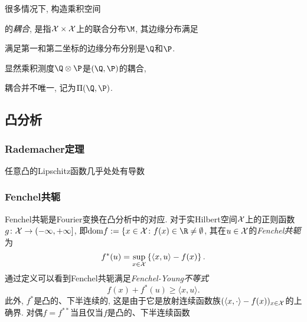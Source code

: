很多情况下, 构造乘积空间

的\emph{耦合}, 是指$\mathcal{X} \times \mathcal{X}$上的联合分布$\M$, 其边缘分布满足

满足第一和第二坐标的边缘分布分别是$\Q$和$\P$.


显然乘积测度$\Q \otimes \P$是$(\Q, \P)$的耦合, 

耦合并不唯一, 记为$\Pi(\Q, \P)$. 


\subsection{凸分析}

\subsubsection{Rademacher定理}

\begin{theorem}[Rademacher]\label{thm:Rademacher}
	任意凸的Lipschitz函数几乎处处有导数
\end{theorem}


\subsubsection{Fenchel共轭}

Fenchel共轭是Fourier变换在凸分析中的对应. 
对于实Hilbert空间$\mathcal{X}$上的正则函数$g \colon \mathcal{X} \to (-\infty, +\infty]$, 即$\mathrm{dom} f := \{x \in \cX \colon f(x) \in \R \neq \emptyset$, 其在$u \in \mathcal{X}$的\emph{Fenchel共轭}为
\begin{equation}
	f^*(u) = \sup_{x \in \mathcal{X}} \left\{ \langle x, u \rangle - f(x) \right\}. 
\end{equation}
通过定义可以看到Fenchel共轭满足\emph{Fenchel-Young不等式}
\begin{equation}
	f(x) + f^*(u) \geq \langle x, u \rangle. 
\end{equation}
此外, $f^*$是凸的、下半连续的, 这是由于它是放射连续函数族$(\langle x, \cdot \rangle - f(x))_{x \in \mathcal{X}}$的上确界. 
对偶$f = f^{**}$当且仅当$f$是凸的、下半连续函数













































